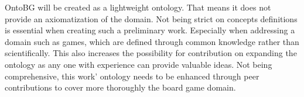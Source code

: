OntoBG will be created as a lightweight ontology. That means it does not provide an axiomatization of the domain. Not being strict on concepts definitions is essential when creating such a preliminary work. Especially when addressing a domain such as games, which are defined through common knowledge rather than scientifically. This also increases the possibility for contribution on expanding the ontology as any one with experience can provide valuable ideas. Not being comprehensive, this work' ontology needs to be enhanced through peer contributions to cover more thoroughly the board game domain.
